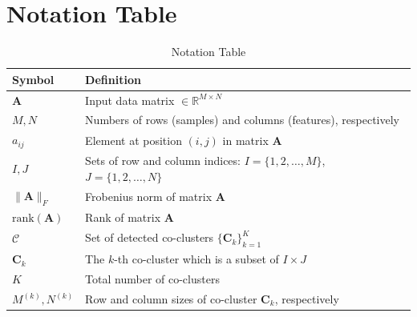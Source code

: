 \documentclass[journal]{IEEEtran}
\theoremstyle{definition}
\theoremstyle{remark} %
\begin{document}
\printbibliography

\appendix

\section{Notation Table}
\label{appendix:notation}

\begin{table}[htbp]
    \centering
    \caption{Notation Table}
    \label{tab:notation}
    \begin{tabular}{@{} p{} p{} @{}}
        \toprule
        \textbf{Symbol}                    & \textbf{Definition}                                                                           \\
        \midrule
        $\mathbf{A}$                       & Input data matrix $\in \mathbb{R}^{M \times N}$                                               \\
        $M, N$                             & Numbers of rows (samples) and columns (features), respectively                                \\
        $a_{ij}$                           & Element at position $(i,j)$ in matrix $\mathbf{A}$                                            \\
        $I, J$                             & Sets of row and column indices: $I = \{1,2,\ldots,M\}$, $J = \{1,2,\ldots,N\}$                \\
        $\|\mathbf{A}\|_F$                 & Frobenius norm of matrix $\mathbf{A}$                                                         \\
        $\text{rank}(\mathbf{A})$          & Rank of matrix $\mathbf{A}$                                                                   \\
        $\mathcal{C}$                      & Set of detected co-clusters $\{\mathbf{C}_k\}_{k=1}^K$                                        \\
        $\mathbf{C}_k$                     & The $k$-th co-cluster which is a subset of $I \times J$                                       \\
        $K$                                & Total number of co-clusters                                                                   \\
        $M^{(k)}, N^{(k)}$                 & Row and column sizes of co-cluster $\mathbf{C}_k$, respectively                               \\

\end{tabular}
\end{table}
\end{document}

